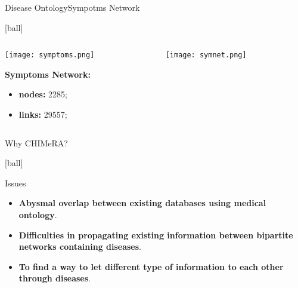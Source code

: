 \documentclass{standalone}
\begin{document}
\begin{frame}{Disease Ontology}{Sympotms Network}

  [ball]

  \begin{columns}

    \begin{column}{0.4\textwidth}
      \centering\texttt{[image: symptoms.png]}

      \textbf{Symptoms Network:}
      \begin{itemize}
        \setlength\itemsep{1em}

        \item \textbf{nodes:} 2285;
        \item \textbf{links:} 29557;
      \end{itemize}

    \end{column}

    \begin{column}{0.6\textwidth}
      \centering\texttt{[image: symnet.png]}
    \end{column}

  \end{columns}

\end{frame}


\begin{frame}{Why CHIMeRA?}

  [ball]

  \begin{alertblock}{Issues}
    \begin{itemize}

      \setlength\itemsep{2em}

      \item \textbf{Abysmal overlap between existing databases using medical ontology}.

      \item \textbf{Difficulties in propagating existing information between bipartite networks containing diseases}.

      \item \textbf{To find a way to let different type of information  to each other through diseases}.

    \end{itemize}
  \end{alertblock}

\end{frame}
\end{document}
